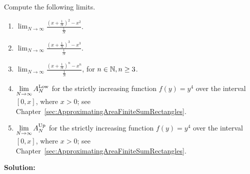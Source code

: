 \Qed

\begin{example}
    Compute the following limits.

    \begin{enumerate}
\renewcommand{\labelenumi}{(\alph{enumi})}
\setlength{\itemsep}{.2cm}
     \item  $\displaystyle\lim_{N \to \infty} \frac{(x + \frac{1}{N})^2 - x^2}{\frac{1}{N}}$.

      \item  $\displaystyle\lim_{N \to \infty} \frac{(x + \frac{1}{N})^3 - x^3}{\frac{1}{N}}$.

      \item  $\displaystyle\lim_{N \to \infty} \frac{(x + \frac{1}{N})^n - x^n}{\frac{1}{N}}$, for $n\in \mathbb N, n\ge3$.

    \item $\displaystyle\lim_{N \to \infty} A^{\rm Low}_N$ for the strictly increasing function $f(y) = y^4$ over the interval $[0, x]$, where $x>0$; see Chapter~\ref{sec:ApproximatingAreaFiniteSumRectangles}.

      \item $\displaystyle\lim_{N \to \infty} A^{\rm Up}_N$ for the strictly increasing function $f(y) = y^4$ over the interval $[0, x]$, where $x>0$; see Chapter~\ref{sec:ApproximatingAreaFiniteSumRectangles}.
     \end{enumerate}
   
\end{example}

\textbf{Solution:}

